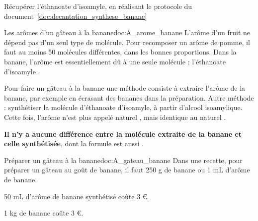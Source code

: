 \mesure Récupérer l'éthanoate d'isoamyle, en réalisant le protocole du document~\ref{doc:decantation_synthese_banane}


\bigskip
\begin{doc}{Les arômes d'un gâteau à la banane}{doc:A_arome_banane}
  L'arôme d'un fruit ne dépend pas d'un seul type de molécule.
  Pour recomposer un arôme de pomme, il faut au moins 50 molécules différentes, dans les bonnes proportions.
  Dans la banane, l'arôme est essentiellement dû à une seule molécule : l'éthanoate d'isoamyle .
  
  Pour faire un gâteau à la banane une méthode consiste à extraire l'arôme de la banane, par exemple en écrasant des bananes dans la préparation.
  Autre méthode : synthétiser la molécule d'éthanoate d'isoamyle, à partir d'alcool isoamylique.
  Cette fois, l'arôme n'est plus appelé \og naturel \fg, mais \og identique au naturel \fg.
  
  \textbf{Il n'y a aucune différence entre la molécule extraite de la banane et celle synthétisée}, dont la formule est aussi .
\end{doc}


\newpage
\begin{doc}{Préparer un gâteau à la banane}{doc:A_gateau_banane}
  Dans une recette, pour préparer un gâteau au goût de banane, il faut 250 g de banane ou 1 mL d'arôme de banane.
  
  \begin{donnees}
    \item 50 mL d'arôme de banane synthétisé coûte 3 \euro.
    \item 1 kg de banane coûte 3 \euro.
  \end{donnees}
\end{doc}


